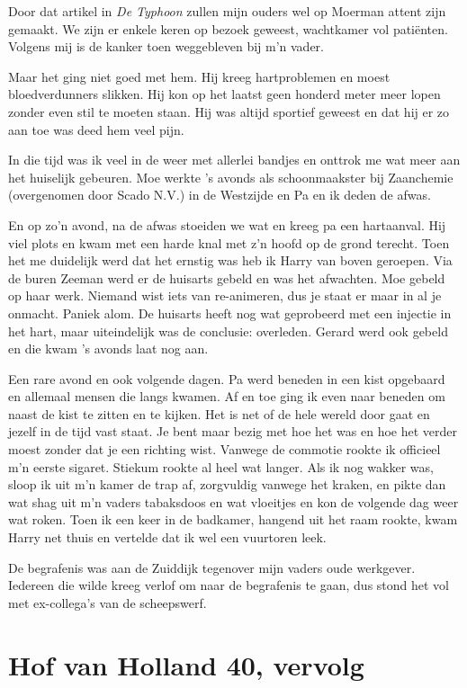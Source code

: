\documentclass[12pt,twoside, openright]{memoir}
\begin{document}
Door dat artikel in \emph{De Typhoon} zullen mijn ouders wel op Moerman attent zijn gemaakt. We zijn er enkele keren op bezoek geweest, wachtkamer vol patiënten. Volgens mij is de kanker toen weggebleven bij m’n vader. 

Maar het ging niet goed met hem. Hij kreeg hartproblemen en moest bloedverdunners slikken. Hij kon op het laatst geen honderd meter meer lopen zonder even stil te moeten staan. Hij was altijd sportief geweest en dat hij er zo aan toe was deed hem veel pijn.

In die tijd was ik veel in de weer met allerlei bandjes en onttrok me wat meer aan het huiselijk gebeuren. Moe werkte ’s avonds als schoonmaakster bij Zaanchemie (overgenomen door Scado N.V.) in de Westzijde en Pa en ik deden de afwas. 

En op zo’n avond, na de afwas stoeiden we wat en kreeg pa een hartaanval. Hij viel plots en kwam met een harde knal met z’n hoofd op de grond terecht. Toen het me duidelijk werd dat het ernstig was heb ik Harry van boven geroepen. Via de buren Zeeman werd er de huisarts gebeld en was het afwachten. Moe gebeld op haar werk. Niemand wist iets van re-animeren, dus je staat er maar in al je onmacht. Paniek alom. De huisarts heeft nog wat geprobeerd met een injectie in het hart, maar uiteindelijk was de conclusie: overleden. Gerard werd ook gebeld en die kwam ’s avonds laat nog aan. 

Een rare avond en ook volgende dagen. Pa werd beneden in een kist opgebaard en allemaal mensen die langs kwamen. Af en toe ging ik even naar beneden om naast de kist te zitten en te kijken. Het is net of de hele wereld door gaat en jezelf in de tijd vast staat. Je bent maar bezig met hoe het was en hoe het verder moest zonder dat je een richting wist. Vanwege de commotie rookte ik officieel m’n eerste sigaret. Stiekum rookte al heel wat langer. Als ik nog wakker was, sloop ik uit m'n kamer de trap af, zorgvuldig vanwege het kraken, en pikte dan wat shag uit m'n vaders tabaksdoos en wat vloeitjes en kon de volgende dag weer wat roken. Toen ik een keer in de badkamer, hangend uit het raam rookte, kwam Harry net thuis en vertelde dat ik wel een vuurtoren leek.

De begrafenis was aan de Zuiddijk tegenover mijn vaders oude werkgever. Iedereen die wilde kreeg verlof om naar de begrafenis te gaan, dus stond het vol met ex-collega’s van de scheepswerf. 

\section*{Hof van Holland 40, vervolg} %
\label{cha:hofvanholland2}
\end{document}
